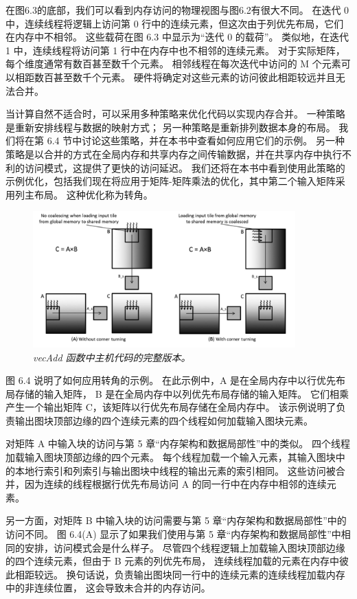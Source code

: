 在图6.3的底部，我们可以看到内存访问的物理视图与图6.2有很大不同。 
在迭代 0 中，连续线程将逻辑上访问第 0 行中的连续元素，但这次由于列优先布局，它们在内存中不相邻。 
这些载荷在图 6.3 中显示为“迭代 0 的载荷”。 类似地，在迭代 1 中，连续线程将访问第 1 行中在内存中也不相邻的连续元素。 
对于实际矩阵，每个维度通常有数百甚至数千个元素。 相邻线程在每次迭代中访问的 M 个元素可以相距数百甚至数千个元素。 
硬件将确定对这些元素的访问彼此相距较远并且无法合并。

当计算自然不适合时，可以采用多种策略来优化代码以实现内存合并。 
一种策略是重新安排线程与数据的映射方式； 另一种策略是重新排列数据本身的布局。 
我们将在第 6.4 节中讨论这些策略，并在本书中查看如何应用它们的示例。 
另一种策略是以合并的方式在全局内存和共享内存之间传输数据，并在共享内存中执行不利的访问模式，这提供了更快的访问延迟。 
我们还将在本书中看到使用此策略的示例优化，包括我们现在将应用于矩阵-矩阵乘法的优化，其中第二个输入矩阵采用列主布局。 
这种优化称为转角。

\begin{figure}[H]
	\centering
	\includegraphics[width=0.9\textwidth]{figs/F6.4.png}
	\caption{\textit{\color{red} vecAdd 函数中主机代码的完整版本。}}
\end{figure}

图 6.4 说明了如何应用转角的示例。 在此示例中，A 是在全局内存中以行优先布局存储的输入矩阵，
B 是在全局内存中以列优先布局存储的输入矩阵。 它们相乘产生一个输出矩阵 C，该矩阵以行优先布局存储在全局内存中。 
该示例说明了负责输出图块顶部边缘的四个连续元素的四个线程如何加载输入图块元素。

对矩阵 A 中输入块的访问与第 5 章“内存架构和数据局部性”中的类似。 四个线程加载输入图块顶部边缘的四个元素。 
每个线程加载一个输入元素，其输入图块中的本地行索引和列索引与输出图块中线程的输出元素的索引相同。 
这些访问被合并，因为连续的线程根据行优先布局访问 A 的同一行中在内存中相邻的连续元素。

另一方面，对矩阵 B 中输入块的访问需要与第 5 章“内存架构和数据局部性”中的访问不同。 
图 6.4(A) 显示了如果我们使用与第 5 章“内存架构和数据局部性”中相同的安排，访问模式会是什么样子。 
尽管四个线程逻辑上加载输入图块顶部边缘的四个连续元素，但由于 B 元素的列优先布局，
连续线程加载的元素在内存中彼此相距较远。 换句话说，负责输出图块同一行中的连续元素的连续线程加载内存中的非连续位置，
这会导致未合并的内存访问。

